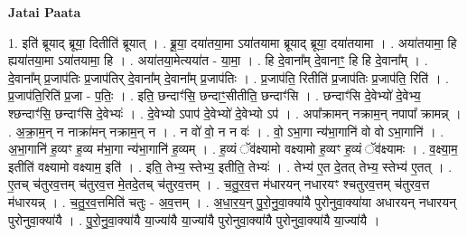 \documentclass[17pt]{extarticle}
\begin{document}
\textbf{Jatai Paata} \newline

1. इति॑ ब्रूयाद् ब्रूया॒ दितीति॑ ब्रूयात् । . ब्रू॒या॒ दया॑तया॒मा ऽया॑तयामा ब्रूयाद् ब्रूया॒ दया॑तयामा । . अया॑तयामा॒ हि ह्यया॑तया॒मा ऽया॑तयामा॒ हि । . अया॑तया॒मेत्यया॑त - या॒मा॒ । . हि दे॒वाना᳚म् दे॒वानाꣳ॒॒ हि हि दे॒वाना᳚म् । . दे॒वाना᳚म् प्र॒जाप॑तिः प्र॒जाप॑तिर् दे॒वाना᳚म् दे॒वाना᳚म् प्र॒जाप॑तिः । . प्र॒जाप॑ति॒ रितीति॑ प्र॒जाप॑तिः प्र॒जाप॑ति॒ रिति॑ । . प्र॒जाप॑ति॒रिति॑ प्र॒जा - प॒तिः॒ । . इति॒ छन्दाꣳ॑सि॒ छन्दाꣳ॒॒सीतीति॒ छन्दाꣳ॑सि । . छन्दाꣳ॑सि दे॒वेभ्यो॑ दे॒वेभ्य॒ श्छन्दाꣳ॑सि॒ छन्दाꣳ॑सि दे॒वेभ्यः॑ । . दे॒वेभ्यो ऽपाप॑ दे॒वेभ्यो॑ दे॒वेभ्यो ऽप॑ । . अपा᳚क्रामन् नक्राम॒न् नपापा᳚ क्रामन्न् । . अ॒क्रा॒म॒न् न नाक्रा॑मन् नक्राम॒न् न । . न वो॑ वो॒ न न वः॑ । . वो॒ ऽभा॒गा न्य॑भा॒गानि॑ वो वो ऽभा॒गानि॑ । . अ॒भा॒गानि॑ ह॒व्यꣳ ह॒व्य म॑भा॒गा न्य॑भा॒गानि॑ ह॒व्यम् । . ह॒व्यं ॅव॑क्ष्यामो वक्ष्यामो ह॒व्यꣳ ह॒व्यं ॅव॑क्ष्यामः । . व॒क्ष्या॒म॒ इतीति॑ वक्ष्यामो वक्ष्याम॒ इति॑ । . इति॒ तेभ्य॒ स्तेभ्य॒ इतीति॒ तेभ्यः॑ । . तेभ्य॑ ए॒त दे॒तत् तेभ्य॒ स्तेभ्य॑ ए॒तत् । . ए॒तच् च॑तुरव॒त्तम् च॑तुरव॒त्त मे॒तदे॒तच् च॑तुरव॒त्तम् । . च॒तु॒र॒व॒त्त म॑धारयन् नधारयꣳ श्चतुरव॒त्तम् च॑तुरव॒त्त म॑धारयन्न् । . च॒तु॒र॒व॒त्तमिति॑ चतुः - अ॒व॒त्तम् । . अ॒धा॒र॒य॒न् पु॒रो॒नु॒वा॒क्या॑यै पुरोनुवा॒क्या॑या अधारयन् नधारयन् पुरोनुवा॒क्या॑यै । . पु॒रो॒नु॒वा॒क्या॑यै या॒ज्या॑यै या॒ज्या॑यै पुरोनुवा॒क्या॑यै पुरोनुवा॒क्या॑यै या॒ज्या॑यै । \newline
\end{document}
